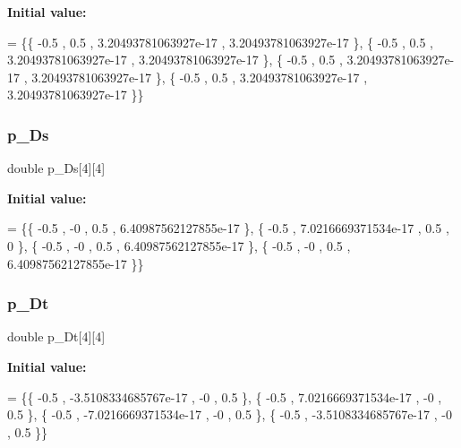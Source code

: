 {\bfseries Initial value\+:}
\begin{DoxyCode}
= \{\{             -0.5 ,               0.5 , 3.20493781063927e-17 , 3.20493781063927e-17 \},
\{             -0.5 ,               0.5 , 3.20493781063927e-17 , 3.20493781063927e-17 \},
\{             -0.5 ,               0.5 , 3.20493781063927e-17 , 3.20493781063927e-17 \},
\{             -0.5 ,               0.5 , 3.20493781063927e-17 , 3.20493781063927e-17 \}\}
\end{DoxyCode}
\mbox{\label{a00479_a52b07158f0aaadb54b5abf96535ffd15}} 
\subsubsection{\texorpdfstring{p\+\_\+\+Ds}{p\_Ds}}
{\footnotesize\ttfamily double p\+\_\+\+Ds\mbox{[}4\mbox{]}\mbox{[}4\mbox{]}}

{\bfseries Initial value\+:}
\begin{DoxyCode}
= \{\{             -0.5 ,                -0 ,               0.5 , 6.40987562127855e-17 \},
\{             -0.5 , 7.0216669371534e-17 ,               0.5 ,                 0 \},
\{             -0.5 ,                -0 ,               0.5 , 6.40987562127855e-17 \},
\{             -0.5 ,                -0 ,               0.5 , 6.40987562127855e-17 \}\}
\end{DoxyCode}
\mbox{\label{a00479_a2651c6cf8d21a2418b2ea45b2d5db6e7}} 
\subsubsection{\texorpdfstring{p\+\_\+\+Dt}{p\_Dt}}
{\footnotesize\ttfamily double p\+\_\+\+Dt\mbox{[}4\mbox{]}\mbox{[}4\mbox{]}}

{\bfseries Initial value\+:}
\begin{DoxyCode}
= \{\{             -0.5 , -3.5108334685767e-17 ,                -0 ,               0.5 \},
\{             -0.5 , 7.0216669371534e-17 ,                -0 ,               0.5 \},
\{             -0.5 , -7.0216669371534e-17 ,                -0 ,               0.5 \},
\{             -0.5 , -3.5108334685767e-17 ,                -0 ,               0.5 \}\}
\end{DoxyCode}
\mbox{\label{a00479_ad164ae44b1bba9ddbd14434ae4ecb671}} 
